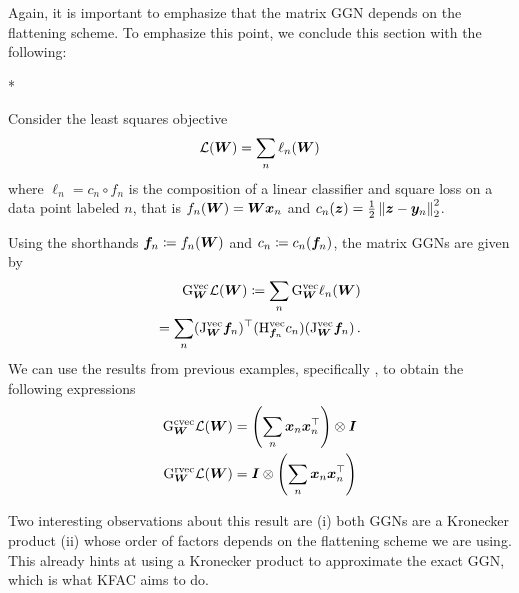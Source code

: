 Again, it is important to emphasize that the matrix GGN depends on the flattening scheme.
To emphasize this point, we conclude this section with the following:

\switchcolumn[1]*
\switchcolumn[0]

\begin{example}
  Consider the least squares objective
  \begin{align*}
    {\mathcal{L}}({\bm{W}}) = \sum_n \ell_n({\bm{W}})
  \end{align*}
  where $\ell_n = c_n \circ f_n$ is the composition of a linear classifier and square loss
  on a data point labeled $n$, that is
  $f_n({\bm{W}}) = {\bm{W}} {\bm{x}}_n$ and $c_n({\bm{z}}) = \frac{1}{2}\left\lVert {\bm{z}} - {\bm{y}}_n \right\rVert^2_2$.

  Using the shorthands ${\bm{f}}_n \coloneq f_n({\bm{W}})$ and $c_n \coloneq c_n({\bm{f}}_n)$, the matrix GGNs are given by
  \begin{align*}
    \mathrm{G}_{{\bm{W}}}^{\operatorname{vec}}{\mathcal{L}}({\bm{W}})
    \coloneq
    \sum_n
    \mathrm{G}_{{\bm{W}}}^{\operatorname{vec}} \ell_n({\bm{W}})
    \\
    =
    \sum_n
    (\mathrm{J}^{\operatorname{vec}}_{{\bm{W}}} {\bm{f}}_n)^{\top}
    (\mathrm{H}^{\operatorname{vec}}_{{\bm{f}}_n} c_n)
    (\mathrm{J}^{\operatorname{vec}}_{{\bm{W}}} {\bm{f}}_n)\,.
  \end{align*}
  We can use the results from previous examples, specifically , to obtain the following expressions
  \begin{align*}
    \mathrm{G}_{{\bm{W}}}^{\operatorname{cvec}}{\mathcal{L}}({\bm{W}})
     & =
    \left(
    \sum_n {\bm{x}}_n {\bm{x}}_n^{\top}
    \right)
    \otimes {\bm{I}}
    \\
    \mathrm{G}_{{\bm{W}}}^{\operatorname{rvec}}{\mathcal{L}}({\bm{W}})
     & =
    {\bm{I}}
    \otimes
    \left(
    \sum_n {\bm{x}}_n {\bm{x}}_n^{\top}
    \right)
  \end{align*}
\end{example}
Two interesting observations about this result are (i) both GGNs are a Kronecker product (ii) whose order of factors depends on the flattening scheme we are using.
This already hints at using a Kronecker product to approximate the exact GGN, which is what KFAC aims to do.


